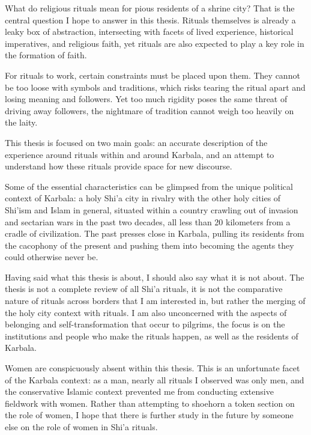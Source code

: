 What do religious rituals mean for pious residents of a shrine city? That is the central question I hope to answer in this thesis. Rituals themselves is already a leaky box of abstraction, intersecting with facets of lived experience, historical imperatives, and religious faith, yet rituals are also expected to play a key role in the formation of faith. 

For rituals to work, certain constraints must be placed upon them. They cannot be too loose with symbols and traditions, which risks tearing the ritual apart and losing meaning and followers. Yet too much rigidity poses the same threat of driving away followers, the nightmare of tradition cannot weigh too heavily on the laity. 

This thesis is focused on two main goals: an accurate description of the experience around rituals within and around Karbala, and an attempt to understand how these rituals provide space for new discourse. 

Some of the essential characteristics can be glimpsed from the unique political context of Karbala: a holy Shi'a city in rivalry with the other holy cities of Shi'ism and Islam in general, situated within a country crawling out of invasion and sectarian wars in the past two decades, all less than 20 kilometers from a cradle of civilization. The past presses close in Karbala, pulling its residents from the cacophony of the present and pushing them into becoming the agents they could otherwise never be. 

Having said what this thesis is about, I should also say what it is not about. The thesis is not a complete review of all Shi'a rituals, it is not the comparative nature of rituals across borders that I am interested in, but rather the merging of the holy city context with rituals. I am also unconcerned with the aspects of belonging and self-transformation that occur to pilgrims, the focus is on the institutions and people who make the rituals happen, as well as the residents of Karbala. 

Women are conspicuously absent within this thesis. This is an unfortunate facet of the Karbala context: as a man, nearly all rituals I observed was only men, and the conservative Islamic context prevented me from conducting extensive fieldwork with women. Rather than attempting to shoehorn a token section on the role of women, I hope that there is further study in the future by someone else on the role of women in Shi'a rituals. 


